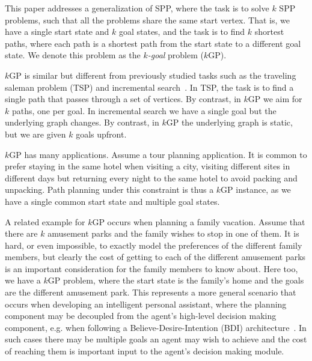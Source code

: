 \documentclass{aicom2e}
\newcommand{\kgs}{$k$GP}
\begin{document}

This paper addresses a generalization of SPP, where the task is to solve $k$
SPP problems, such that all the problems share the same start vertex. That is,
we have a single start state and $k$ goal states, and the task is to find $k$
shortest paths, where each path is a shortest path from the start state to a
different goal state. We denote this problem as the {\em $k$-goal} problem
(\kgs{}).



\kgs{} is similar but different from previously studied tasks such as the
traveling saleman problem (TSP) and incremental
search~\cite{koenig2004lifelong}. In TSP, the task is to find a single path
that passes through a set of vertices. By contrast, in \kgs{} we aim for $k$
paths, one per goal. In incremental search we have a single goal but the
underlying graph changes. By contrast, in \kgs{} the underlying graph is static, 
but we are given $k$ goals upfront. %



\kgs{} has many applications. Assume a tour planning application. It is common
to prefer staying in the same hotel when visiting a city, visiting different
sites in different days but returning every night to the same hotel to avoid
packing and unpacking. Path planning under this constraint is thus a \kgs{}
instance, as we have a single common start state and multiple goal states.


A related example for \kgs{} occurs when planning a family vacation. Assume
that there are $k$ amusement parks and the family wishes to stop in one of
them. It is hard, or even impossible, to exactly model the preferences of the
different family members, but clearly the cost of getting to each of the
different amusement parks is an important consideration for the family members
to know about. Here too, we have a \kgs{} problem, where the start state is the
family's home and the goals are the different amusement park. This represents a
more general scenario that occurs when developing an intelligent personal
assistant, where the planning component may be decoupled from the agent's
high-level decision making component, e.g. when following a
Believe-Desire-Intention (BDI)
architecture~\cite{bratman1999intention,georgeff1998belief}. In such cases
there may be multiple goals an agent may wish to achieve and the cost of
reaching them is important input to the agent's decision making module.
\end{document}
